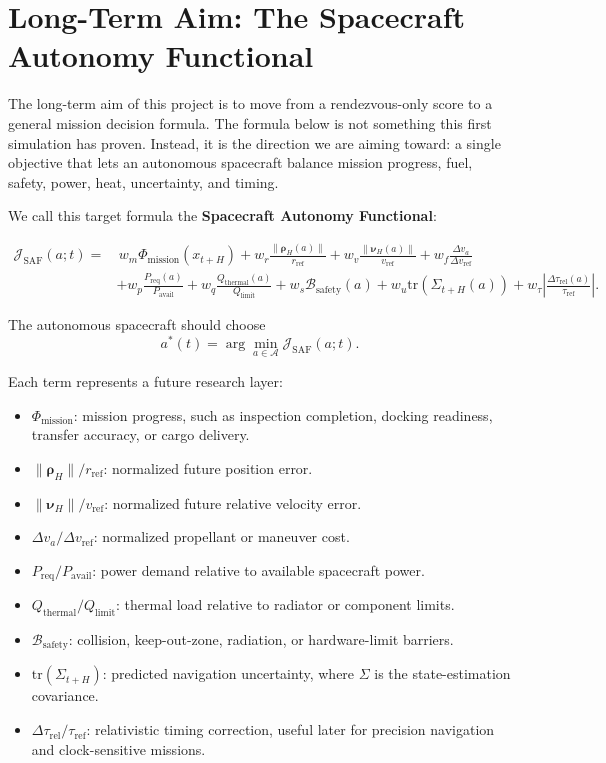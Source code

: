 \documentclass[11pt]{article}
\begin{document}
\section{Long-Term Aim: The Spacecraft Autonomy Functional}

The long-term aim of this project is to move from a rendezvous-only score to a general mission decision formula.
The formula below is not something this first simulation has proven.
Instead, it is the direction we are aiming toward: a single objective that lets an autonomous spacecraft balance mission progress, fuel, safety, power, heat, uncertainty, and timing.

We call this target formula the \textbf{Spacecraft Autonomy Functional}:

\[
\boxed{
\begin{aligned}
    \mathcal J_{\mathrm{SAF}}(a;t)
    =
    &\,w_m \Phi_{\mathrm{mission}}(x_{t+H})
    + w_r \frac{\|\boldsymbol\rho_H(a)\|}{r_{\mathrm{ref}}}
    + w_v \frac{\|\boldsymbol\nu_H(a)\|}{v_{\mathrm{ref}}}
    + w_f \frac{\Delta v_a}{\Delta v_{\mathrm{ref}}}
    \\
    &+ w_p \frac{P_{\mathrm{req}}(a)}{P_{\mathrm{avail}}}
    + w_q \frac{Q_{\mathrm{thermal}}(a)}{Q_{\mathrm{limit}}}
    + w_s \mathcal B_{\mathrm{safety}}(a)
    + w_u \mathrm{tr}\!\left(\Sigma_{t+H}(a)\right)
    + w_\tau \left|\frac{\Delta \tau_{\mathrm{rel}}(a)}{\tau_{\mathrm{ref}}}\right|.
\end{aligned}
}
\]

The autonomous spacecraft should choose
\[
    a^*(t)
    =
    \arg\min_{a \in \mathcal A}
    \mathcal J_{\mathrm{SAF}}(a;t).
\]

Each term represents a future research layer:

\begin{itemize}
    \item \(\Phi_{\mathrm{mission}}\): mission progress, such as inspection completion, docking readiness, transfer accuracy, or cargo delivery.
    \item \(\|\boldsymbol\rho_H\|/r_{\mathrm{ref}}\): normalized future position error.
    \item \(\|\boldsymbol\nu_H\|/v_{\mathrm{ref}}\): normalized future relative velocity error.
    \item \(\Delta v_a/\Delta v_{\mathrm{ref}}\): normalized propellant or maneuver cost.
    \item \(P_{\mathrm{req}}/P_{\mathrm{avail}}\): power demand relative to available spacecraft power.
    \item \(Q_{\mathrm{thermal}}/Q_{\mathrm{limit}}\): thermal load relative to radiator or component limits.
    \item \(\mathcal B_{\mathrm{safety}}\): collision, keep-out-zone, radiation, or hardware-limit barriers.
    \item \(\mathrm{tr}(\Sigma_{t+H})\): predicted navigation uncertainty, where \(\Sigma\) is the state-estimation covariance.
    \item \(\Delta \tau_{\mathrm{rel}}/\tau_{\mathrm{ref}}\): relativistic timing correction, useful later for precision navigation and clock-sensitive missions.
\end{itemize}
\end{document}
